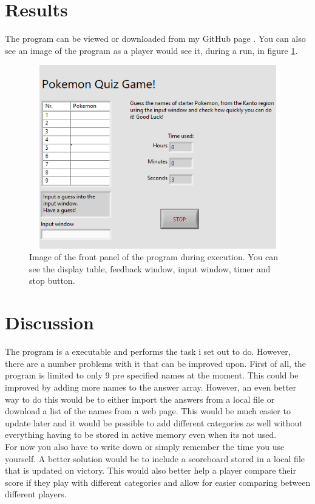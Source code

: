 \documentclass[11pt, A4paper, english]{article}
\begin{document}
	\section{Results}
The program can be viewed or downloaded from my GitHub page \cite{github_repo}. You can also see an image of the program as a player would see it, during a run, in figure \ref{front_panel}.
		\begin{figure}
\includegraphics[width=12.6cm, height=8cm]{screenshot_front_panel.png}
\caption{Image of the front panel of the program during execution. You can see the display table, feedback window, input window, timer and stop button.}
\label{front_panel}
		\end{figure}

	\section{Discussion}
The program is a executable and performs the task i set out to do. However, there are a number problems with it that can be improved upon. First of all, the program is limited to only 9 pre specified names at the moment. This could be improved by adding more names to the answer array. However, an even better way to do this would be to either import the answers from a local file or download a list of the names from a web page. This would be much easier to update later and it would be possible to add different categories as well without everything having to be stored in active memory even when its not used. \\

For now you also have to write down or simply remember the time you use yourself. A better solution would be to include a scoreboard stored in a local file that is updated on victory. This would also better help a player compare their score if they play with different categories and allow for easier comparing between different players. \\
\end{document}
